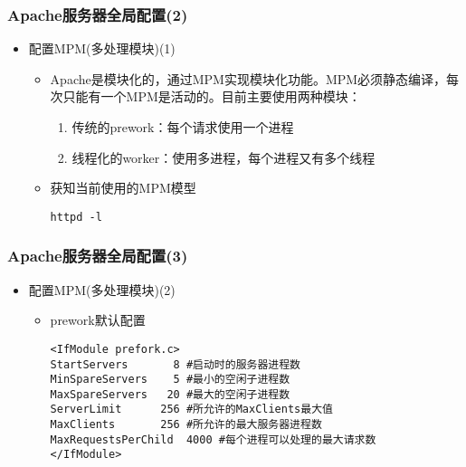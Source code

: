 \documentclass[xcolor=svgnames,presentation]{beamer}
\begin{document}
\begin{frame}[fragile]
\frametitle{Apache服务器全局配置(2)}
\label{sec-1-5}
\begin{itemize}

\item 配置MPM(多处理模块)(1)
\label{sec-1-5-1}%
\begin{itemize}

\item Apache是模块化的，通过MPM实现模块化功能。MPM必须静态编译，每次只能有一个MPM是活动的。目前主要使用两种模块：
\label{sec-1-5-1-1}%
\begin{enumerate}
\item 传统的prework：每个请求使用一个进程
\item 线程化的worker：使用多进程，每个进程又有多个线程
\end{enumerate}

\item 获知当前使用的MPM模型\\
\label{sec-1-5-1-2}%
\begin{verbatim}
httpd -l
\end{verbatim}
\end{itemize} %
\end{itemize} %
\end{frame}
\begin{frame}[fragile]
\frametitle{Apache服务器全局配置(3)}
\label{sec-1-6}
\begin{itemize}

\item 配置MPM(多处理模块)(2)
\label{sec-1-6-1}%
\begin{itemize}

\item prework默认配置\\
\label{sec-1-6-1-1}%
\begin{verbatim}
<IfModule prefork.c>
StartServers       8 #启动时的服务器进程数
MinSpareServers    5 #最小的空闲子进程数
MaxSpareServers   20 #最大的空闲子进程数
ServerLimit      256 #所允许的MaxClients最大值
MaxClients       256 #所允许的最大服务器进程数
MaxRequestsPerChild  4000 #每个进程可以处理的最大请求数
</IfModule>
\end{verbatim}
\end{itemize} %
\end{itemize} %
\end{frame}
\end{document}
